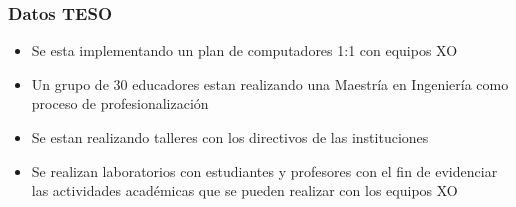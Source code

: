 \documentclass[conference]{IEEEtran}
\begin{document}
\subsubsection{Datos TESO}
\begin{itemize}
\item Se esta implementando un plan de computadores 1:1 con equipos XO
\item Un grupo de 30 educadores estan realizando una Maestría en Ingeniería como proceso de profesionalización
\item Se estan realizando talleres con los directivos de las instituciones
\item Se realizan laboratorios con estudiantes y profesores con el fin de evidenciar las actividades académicas que se pueden realizar con los equipos XO

\end{itemize}



%
%



%
%
\end{document}
